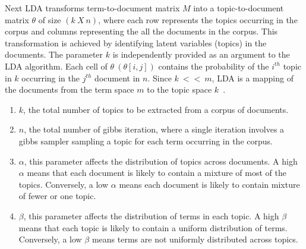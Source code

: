 Next LDA transforms term-to-document matrix $M$ into a topic-to-document matrix $\theta$ of size $(k\ X\ n)$,
where each row represents the topics occurring in the corpus and columns representing the all the documents in the corpus. 
This transformation is achieved by identifying latent variables (topics) in the documents. 
The parameter $k$ is independently provided as an argument to the LDA algorithm.
Each cell of $\theta\ (\theta[i,j])$ contains the probability of the $i^{th}$ topic in $k$ occurring in the $j^{th}$ document in $n$. Since $k\ <<\ m$, LDA is a mapping of the documents from the term space $m$ to the topic space $k$~\cite{panichella2013effectively}.


\begin{enumerate}
	\item $k$, the total number of topics to be extracted from a corpus of documents.  
	\item $n$, the total number of gibbs iteration, where a single iteration involves a gibbs sampler sampling a topic for each term occurring in the corpus.
	\item $\alpha$, this parameter affects the distribution of topics across documents. A high $\alpha$ means that each document is likely to contain a mixture of most of the topics. Conversely, a low $\alpha$ means each document is likely to contain mixture of fewer or one topic. 
	\item $\beta$, this parameter affects the distribution of terms in each topic. A high $\beta$ means that each topic is likely to contain a uniform distribution of terms. Conversely, a low $\beta$ means terms are not uniformly distributed across topics. 
	
\end{enumerate}



